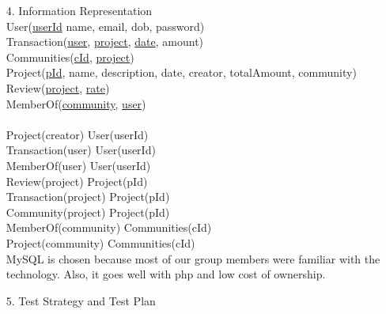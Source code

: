 \documentclass[12pt]{article}
\begin{document}
\begin{enumerate}
\item[4.] Information Representation\\
User(\underline{userId} name, email, dob, password)\\
Transaction(\underline{user}, \underline{project}, \underline{date}, amount)\\
Communities(\underline{cId}, \underline{project})\\
Project(\underline{pId}, name, description, date, creator, totalAmount, community)\\
Review(\underline{project}, \underline{rate})\\
MemberOf(\underline{community}, \underline{user})\\
\\
Project(creator) \subseteq User(userId)\\
Transaction(user) \subseteq User(userId)\\
MemberOf(user) \subseteq User(userId)\\
Review(project) \subseteq Project(pId)\\
Transaction(project) \subseteq Project(pId)\\
Community(project) \subseteq Project(pId)\\
MemberOf(community) \subseteq Communities(cId)\\
Project(community) \subseteq Communities(cId)\\

MySQL is chosen because most of our group members were familiar with the technology.
Also, it goes well with php and low cost of ownership.
 

\item[5.] Test Strategy and Test Plan


\end{enumerate}
\end{document}
